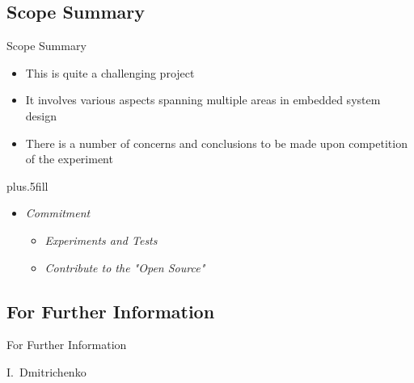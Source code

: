 \documentclass{beamer}
\begin{document}
\subsection{Scope Summary}
\begin{frame}{Scope Summary}

  \begin{itemize}
   \pause
  \item
    This is quite a \alert{challenging project}
   \pause
  \item
    It involves \alert{various aspects}
   \newline spanning multiple areas in embedded system design
   \pause
  \item
    There is a number of concerns and conclusions
    \newline to be made upon competition of \alert{the experiment}
  \end{itemize}

  \pause
  
  \vskip0pt plus.5fill
  \begin{itemize}
  \item
    \emph{Commitment}
    \begin{itemize}
    \item
      \emph{Experiments and Tests}
    \item
      \emph{Contribute to the "Open Source"}
    \end{itemize}

\end{itemize}
\end{frame}



\subsection*{For Further Information}

\begin{frame}{For Further Information}
    
\begin{thebibliography}{10}
    
  \beamertemplatearticlebibitems

    I.~Dmitrichenko
 
    
\end{thebibliography}
\end{frame}
\end{document}
